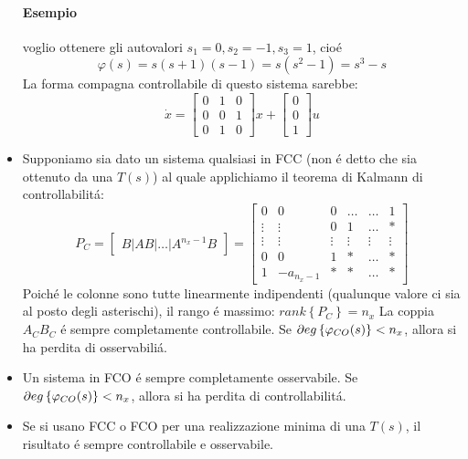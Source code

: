 \documentclass[../main.tex]{subfiles}
\begin{document}
\begin{itemize}
				\paragraph{Esempio} voglio ottenere gli autovalori $ s_1 = 0, s_2 = -1, s_3 = 1 $, cio\'e
					\[
						\varphi(s) = s(s+1)(s-1) = s(s^2-1) = s^3 - s
					\]
					La forma compagna controllabile di questo sistema sarebbe:
					\[
						\dot x =
						\begin{bmatrix}
							0 & 1 & 0\\
							0 & 0 & 1\\
							0 & 1 & 0
						\end{bmatrix} x+
						\begin{bmatrix}
							0\\
							0\\
							1
						\end{bmatrix} u
					\]
			\item 
				Supponiamo sia dato un sistema qualsiasi in FCC (non \'e detto che sia ottenuto da una $ T(s) $) al quale applichiamo il teorema di Kalmann di controllabilit\'a:
				\[
					P_C =
					\begin{bmatrix}
						B | AB | \dots | A^{n_x-1}B
					\end{bmatrix} =
					\begin{bmatrix}
						0 		& 0 		& 0 		& \dots 	& \dots 	& 1\\
						\vdots 	& \vdots 	& 0			& 1 		& \dots		& *\\
						\vdots 	& \vdots	& \vdots	& \vdots	& \vdots	& \vdots\\
						0 		& 0 		& 1 		& *		 	& \dots 	& *\\
						1 		& -a_{n_x-1} & * 		& * 	& \dots		& *
					\end{bmatrix}
				\]
				Poich\'e le colonne sono tutte linearmente indipendenti (qualunque valore ci sia al posto degli asterischi), il rango \'e massimo: $ rank \left\lbrace P_C \right\rbrace = n_x $ 
				La coppia $ A_C B_C $ \'e sempre completamente controllabile. Se $ \partial eg \left\lbrace \varphi_{CO}(s) \right\rbrace < n_x $, allora si ha perdita di osservabili\'a.
			\item 
				Un sistema in FCO \'e sempre completamente osservabile. Se  $ \partial eg \left\lbrace \varphi_{CO}(s) \right\rbrace < n_x $, allora si ha perdita di controllabilit\'a.
			\item 
				Se si usano FCC o FCO per una realizzazione minima di una $ T(s) $, il risultato \'e sempre controllabile e osservabile.
				

\end{itemize}
\end{document}
